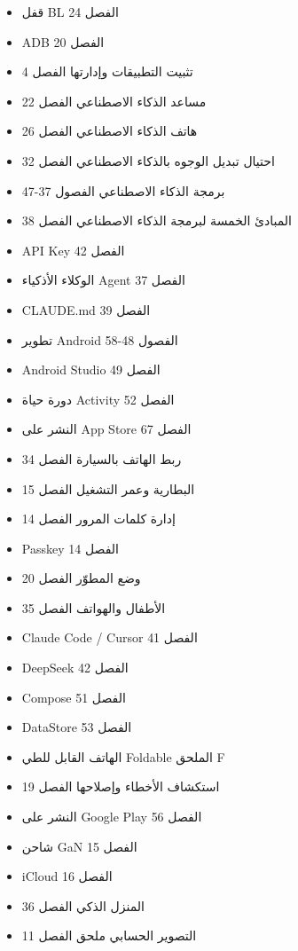 


\begin{itemize}
  \item قفل BL الفصل 24
  \item ADB الفصل 20
  \item تثبيت التطبيقات وإدارتها الفصل 4
  \item مساعد الذكاء الاصطناعي الفصل 22
  \item هاتف الذكاء الاصطناعي الفصل 26
  \item احتيال تبديل الوجوه بالذكاء الاصطناعي الفصل 32
  \item برمجة الذكاء الاصطناعي الفصول 37-47
  \item المبادئ الخمسة لبرمجة الذكاء الاصطناعي الفصل 38
  \item API Key الفصل 42
  \item الوكلاء الأذكياء Agent الفصل 37
  \item CLAUDE.md الفصل 39
  \item تطوير Android الفصول 48-58
  \item Android Studio الفصل 49
  \item دورة حياة Activity الفصل 52
  \item النشر على App Store الفصل 67
\end{itemize}


\begin{itemize}
  \item ربط الهاتف بالسيارة الفصل 34
  \item البطارية وعمر التشغيل الفصل 15
  \item إدارة كلمات المرور الفصل 14
  \item Passkey الفصل 14
  \item وضع المطوّر الفصل 20
  \item الأطفال والهواتف الفصل 35
  \item Claude Code / Cursor الفصل 41
  \item DeepSeek الفصل 42
  \item Compose الفصل 51
  \item DataStore الفصل 53
\end{itemize}


\begin{itemize}
  \item الهاتف القابل للطي Foldable الملحق F
  \item استكشاف الأخطاء وإصلاحها الفصل 19
  \item النشر على Google Play الفصل 56
  \item شاحن GaN الفصل 15
  \item iCloud الفصل 16
  \item المنزل الذكي الفصل 36
  \item التصوير الحسابي ملحق الفصل 11
\end{itemize}

